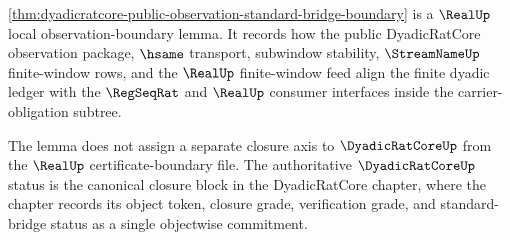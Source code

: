 \autoref{thm:dyadicratcore-public-observation-standard-bridge-boundary}
is a $\RealUp$ local observation-boundary lemma. It records how the public
DyadicRatCore observation package, $\hsame$ transport, subwindow stability,
$\StreamNameUp$ finite-window rows, and the $\RealUp$ finite-window feed align
the finite dyadic ledger with the $\RegSeqRat$ and $\RealUp$ consumer
interfaces inside the carrier-obligation subtree.

The lemma does not assign a separate closure axis to $\DyadicRatCoreUp$ from
the $\RealUp$ certificate-boundary file. The authoritative $\DyadicRatCoreUp$
status is the canonical closure block in the DyadicRatCore chapter, where the
chapter records its object token, closure grade, verification grade, and
standard-bridge status as a single objectwise commitment.
